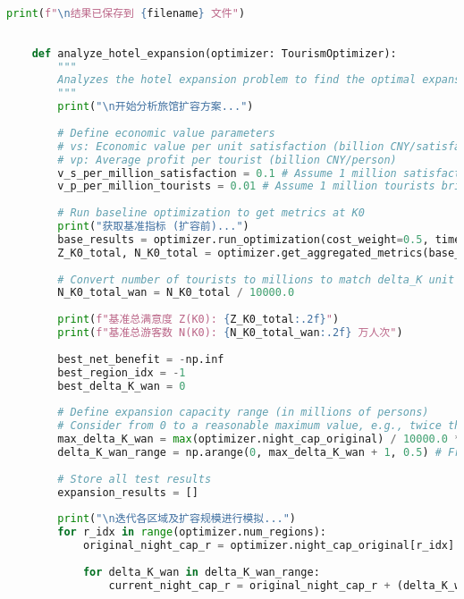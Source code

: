 \begin{lstlisting}[language=Python]
        print(f"\n结果已保存到 {filename} 文件")
    
    
    def analyze_hotel_expansion(optimizer: TourismOptimizer):
        """
        Analyzes the hotel expansion problem to find the optimal expansion area and scale.
        """
        print("\n开始分析旅馆扩容方案...")
    
        # Define economic value parameters
        # vs: Economic value per unit satisfaction (billion CNY/satisfaction)
        # vp: Average profit per tourist (billion CNY/person)
        v_s_per_million_satisfaction = 0.1 # Assume 1 million satisfaction brings 0.1 billion CNY
        v_p_per_million_tourists = 0.01 # Assume 1 million tourists brings 0.01 billion CNY (10 CNY/person, 1 million * 10 = 10 million CNY = 0.01 billion CNY)
    
        # Run baseline optimization to get metrics at K0
        print("获取基准指标 (扩容前)...")
        base_results = optimizer.run_optimization(cost_weight=0.5, time_weight=0.5, tourists_1day=30000, tourists_2day=30000, tourists_3day=20000)
        Z_K0_total, N_K0_total = optimizer.get_aggregated_metrics(base_results)
        
        # Convert number of tourists to millions to match delta_K unit
        N_K0_total_wan = N_K0_total / 10000.0
    
        print(f"基准总满意度 Z(K0): {Z_K0_total:.2f}")
        print(f"基准总游客数 N(K0): {N_K0_total_wan:.2f} 万人次")
    
        best_net_benefit = -np.inf
        best_region_idx = -1
        best_delta_K_wan = 0
        
        # Define expansion capacity range (in millions of persons)
        # Consider from 0 to a reasonable maximum value, e.g., twice the original maximum capacity
        max_delta_K_wan = max(optimizer.night_cap_original) / 10000.0 * 2 # Twice the original max capacity, in millions of persons
        delta_K_wan_range = np.arange(0, max_delta_K_wan + 1, 0.5) # From 0 to max_delta_K_wan, step 0.5 million persons
        
        # Store all test results
        expansion_results = []
    
        print("\n迭代各区域及扩容规模进行模拟...")
        for r_idx in range(optimizer.num_regions):
            original_night_cap_r = optimizer.night_cap_original[r_idx] # Get the original capacity of this region
    
            for delta_K_wan in delta_K_wan_range:
                current_night_cap_r = original_night_cap_r + (delta_K_wan * 10000) # Convert millions of persons back to persons
                

\end{lstlisting}
